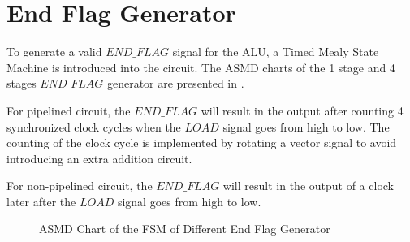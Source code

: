 \clearpage
\section{End Flag Generator}

To generate a valid \(END\_FLAG\) signal for the ALU, a Timed Mealy State Machine is introduced into the circuit.
The ASMD charts of the 1 stage and 4 stages \(END\_FLAG\) generator are presented in .

For pipelined circuit, the \(END\_FLAG\) will result in the output after counting 4 synchronized clock cycles
when the \(LOAD\) signal goes from high to low. The counting of the clock cycle is implemented by rotating a
vector signal to avoid introducing an extra addition circuit.

For non-pipelined circuit, the \(END\_FLAG\) will result in the output of a clock later after the \(LOAD\) signal goes from high to low.

\begin{figure}[!ht]
	\centering
	\caption{ASMD Chart of the FSM of Different End Flag Generator}
	\label{fig:asmd}

	\hspace{1cm}

\end{figure}

